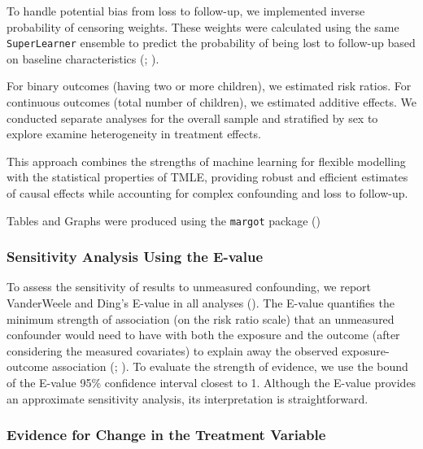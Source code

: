 \documentclass[
  single column]{article}
\begin{document}
To handle potential bias from loss to follow-up, we implemented inverse
probability of censoring weights. These weights were calculated using
the same \texttt{SuperLearner} ensemble to predict the probability of
being lost to follow-up based on baseline characteristics
(;
).

For binary outcomes (having two or more children), we estimated risk
ratios. For continuous outcomes (total number of children), we estimated
additive effects. We conducted separate analyses for the overall sample
and stratified by sex to explore examine heterogeneity in treatment
effects.

This approach combines the strengths of machine learning for flexible
modelling with the statistical properties of TMLE, providing robust and
efficient estimates of causal effects while accounting for complex
confounding and loss to follow-up.

Tables and Graphs were produced using the \texttt{margot} package
()

\subsubsection{Sensitivity Analysis Using the
E-value}\label{sensitivity-analysis-using-the-e-value}

To assess the sensitivity of results to unmeasured confounding, we
report VanderWeele and Ding's E-value in all analyses
(). The E-value
quantifies the minimum strength of association (on the risk ratio scale)
that an unmeasured confounder would need to have with both the exposure
and the outcome (after considering the measured covariates) to explain
away the observed exposure-outcome association
(;
). To evaluate
the strength of evidence, we use the bound of the E-value 95\%
confidence interval closest to 1. Although the E-value provides an
approximate sensitivity analysis, its interpretation is straightforward.

\subsubsection{Evidence for Change in the Treatment
Variable}\label{evidence-for-change-in-the-treatment-variable}
\end{document}
